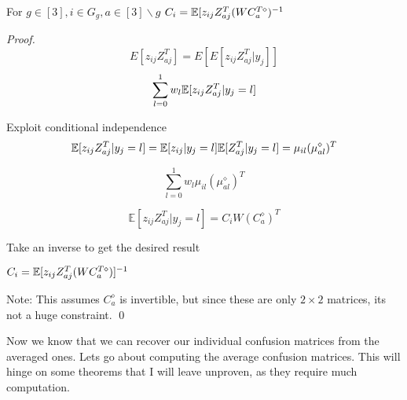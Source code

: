 \begin{lemma}
For $g \in [3], i \in G_{g}, a \in [3]\backslash{g}$
$C_{i} = \mathbb{E}[z_{ij}Z^{T}_{aj}(WC^{T{\diamond}}_{a})^{-1}$
\begin{proof}
$$ E[z_{ij}Z^{T}_{aj}] = E[E[z_{ij}Z^{T}_{aj}| y_{j}]] $$
$$ \displaystyle\sum\limits_{l = 0}^{1} w_{l}\mathbb{E}[z_{ij}Z^{T}_{aj} | y_{j} = l]$$

Exploit conditional independence
$$ \mathbb{E}[z_{ij}Z^{T}_{aj} | y_{j} = l] =  \mathbb{E}[z_{ij} | y_{j} = l] \mathbb{E}[Z^{T}_{aj} | y_{j} = l] = \mu_{il}(\mu^{\diamond}_{al})^{T} $$


$$ \displaystyle\sum\limits_{l = 0}^{1} w_{l}\mu_{il}(\mu^{\diamond}_{al})^{T}$$

$$\mathbb{E}[z_{ij}Z^{T}_{aj} | y_{j} = l] =  C_{i}W(C^{\diamond}_{a})^{T} $$

Take an inverse to get the desired result

$C_{i} = \mathbb{E}[z_{ij}Z^{T}_{aj}(WC^{T\diamond}_{a})]^{-1}$

Note: This assumes $C^{\diamond}_{a}$ is invertible, but since these are only $2 \times 2$ matrices, its not a huge constraint.
\qed
\end{proof}
\end{lemma}

Now we know that we can recover our individual confusion matrices from the averaged ones. Lets go about computing the average confusion matrices. This will hinge on some theorems that I will leave unproven, as they require much computation.



